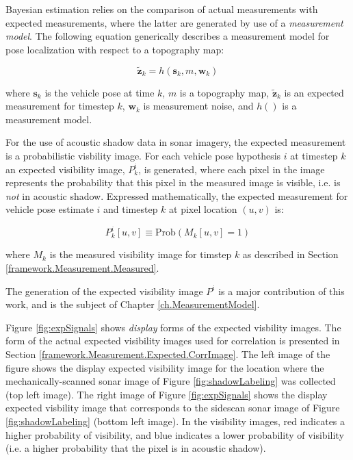 Bayesian estimation relies on the comparison of actual measurements with expected measurements, where the latter are generated by use of a \emph{measurement model}.  
The following equation generically describes a measurement model for pose localization with respect to a topography map:

\begin{equation}
\tilde{\mathbf{z}}_k = h(\mathbf{s}_k, m, \mathbf{w}_k)
\label{eq:genericMeasurementModel}
\end{equation}

\noindent where $\mathbf{s}_k$ is the vehicle pose at time $k$, $m$ is a topography map, $\tilde{\mathbf{z}}_k$ is an expected measurement for timestep $k$, $\mathbf{w}_k$ is measurement noise, and $h()$ is a measurement model.

For the use of acoustic shadow data in sonar imagery, the expected measurement is a probabilistic visbility image.
For each vehicle pose hypothesis $i$ at timestep $k$ an expected visibility image, $P_k^{i}$, is generated, where each pixel in the image represents the probability that this pixel in the measured image is visible, i.e. is \emph{not} in acoustic shadow.
Expressed mathematically, the expected measurement for vehicle pose estimate $i$ and timestep $k$ at pixel location $(u,v)$ is:

\begin{equation}
P_k^{i}[u,v] \equiv \text{Prob}(M_k[u,v] = 1)
\label{eq:PM}
\end{equation}

\noindent where $M_k$ is the measured visibility image for timstep $k$ as described in Section \ref{framework.Measurement.Measured}.

The generation of the expected visibility image $P^{i}$ is a major contribution of this work, and is the subject of Chapter \ref{ch.MeasurementModel}.

Figure \ref{fig:expSignals} shows \emph{display} forms of the expected visbility images.  
The form of the actual expected visibility images used for correlation is presented in Section \ref{framework.Measurement.Expected.CorrImage}.
The left image of the figure shows the display expected visibility image for the location where the mechanically-scanned sonar image of Figure \ref{fig:shadowLabeling} was collected (top left image).
The right image of Figure \ref{fig:expSignals} shows the display expected visbility image that corresponds to the sidescan sonar image of Figure \ref{fig:shadowLabeling} (bottom left image).
In the visibility images, red indicates a higher probability of visibility, and blue indicates a lower probability of visibility (i.e. a higher probability that the pixel is in acoustic shadow).

